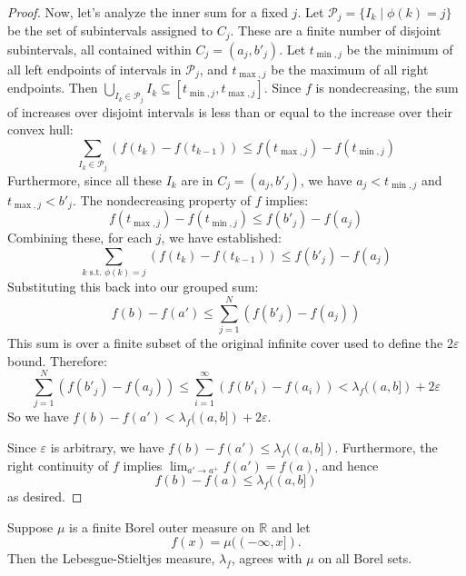 \documentclass[../main.tex]{subfiles}
\begin{document}
\begin{proof}
Now, let's analyze the inner sum for a fixed \( j \). Let \( \mathcal{P}_j = \{ I_k \mid \phi(k)=j \} \) be the set of subintervals assigned to \( C_j \). These are a finite number of disjoint subintervals, all contained within \( C_j = (a_j, b'_j) \). Let \( t_{\min, j} \) be the minimum of all left endpoints of intervals in \( \mathcal{P}_j \), and \( t_{\max, j} \) be the maximum of all right endpoints. Then \( \bigcup_{I_k \in \mathcal{P}_j} I_k \subseteq [t_{\min, j}, t_{\max, j}] \).
Since \( f \) is nondecreasing, the sum of increases over disjoint intervals is less than or equal to the increase over their convex hull:
\[ \sum_{I_k \in \mathcal{P}_j} (f(t_k) - f(t_{k-1})) \le f(t_{\max, j}) - f(t_{\min, j}) \]
Furthermore, since all these \( I_k \) are in \( C_j = (a_j, b'_j) \), we have \( a_j < t_{\min, j} \) and \( t_{\max, j} < b'_j \). The nondecreasing property of \( f \) implies:
\[ f(t_{\max, j}) - f(t_{\min, j}) \le f(b'_j) - f(a_j) \]
Combining these, for each \( j \), we have established:
\[ \sum_{k \text{ s.t. } \phi(k)=j} (f(t_k) - f(t_{k-1})) \le f(b'_j) - f(a_j) \]
Substituting this back into our grouped sum:
\[ f(b) - f(a') \le \sum_{j=1}^N (f(b'_j) - f(a_j)) \]
This sum is over a finite subset of the original infinite cover used to define the \( 2\varepsilon \) bound. Therefore:
\[ \sum_{j=1}^N (f(b'_j) - f(a_j)) \le \sum_{i=1}^\infty (f(b'_i) - f(a_i)) < \lambda_f((a, b]) + 2\varepsilon \]
So we have \( f(b) - f(a') < \lambda_f((a, b]) + 2\varepsilon \).
 

Since \( \varepsilon \) is arbitrary, we have \( f(b) - f(a') \le \lambda_f((a, b]) \).
Furthermore, the right continuity of \( f \) implies \( \lim_{a' \to a^+} f(a') = f(a) \), and hence
\[ f(b) - f(a) \le \lambda_f((a, b]) \]
as desired.
\end{proof}


\begin{theorem}{}{}
Suppose $\mu$ is a finite Borel outer measure on $\mathbb{R}$ and let
\[ f(x) = \mu((-\infty, x]). \]
Then the Lebesgue-Stieltjes measure, $\lambda_f$, agrees with $\mu$ on all Borel sets.
\end{theorem}
\end{document}
